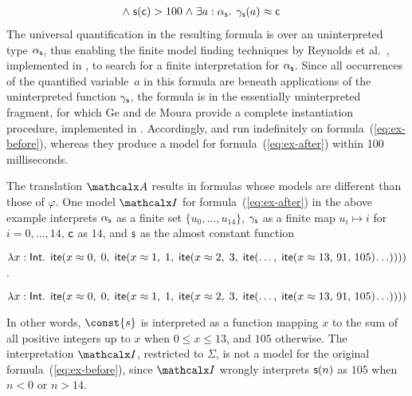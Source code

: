\begin{example}
\begin{equation}
\begin{aligned}[c]
\begin{aligned}[t]
\end{aligned}
\\[-\jot]
 & {\wedge}\; \con{s}( \con{c} ) > 100 \wedge \exists a : {\fargtype{\con{s}}}.\;\, \farg{\con{s}}( a ) \teq \con{c}
\end{aligned}
\end{equation}
%
The universal quantification in the resulting formula is over an uninterpreted
type $\alpha_{\mathsf{s}}$, thus enabling the finite model finding
techniques by Reynolds et al.\ \cite{ReyEtAl-1-RR-13,reynolds-et-al-2013},
implemented in \cvc, to search for a finite interpretation for $\alpha_{\mathsf{s}}$. 
Since all occurrences of the quantified variable~$a$ in this formula are 
beneath applications of the uninterpreted function $\gamma_{\mathsf{s}}$, 
the formula is in the essentially uninterpreted fragment,
for which Ge and de Moura \cite{GeDeM-CAV-09} provide 
a complete instantiation procedure, implemented in \ziii. 
Accordingly,
\cvc and \ziii run indefinitely on formula~(\ref{eq:ex-before}), 
whereas they produce a model for formula~(\ref{eq:ex-after}) 
within 100 milliseconds.\xend
\end{example}

\newcommand\badlambda{\lambda x : \typeint.\allowbreak\;\, \lite( x \teq 0,\allowbreak\; 0,\allowbreak\;
  \lite( x \teq 1,\allowbreak\; 1,\allowbreak\;
    \lite( x \teq 2,\allowbreak\; 3,\allowbreak\;
      \lite(\ldots,\allowbreak\; \lite( x \teq 13,\allowbreak\, 91,\allowbreak\, 105 )\negvthinspace \ldots ))))}

The translation $\conv$ results in formulas whose models are different than those of $\varphi$.
One model $\I$ for formula~(\ref{eq:ex-after}) in the above example interprets
$\alpha_{\mathsf{s}}$ as a finite set $\{ u_0, \ldots, u_{14} \}$,
$\gamma_{\mathsf{s}}$ as a finite map $u_i \mapsto i$ for $i = 0, \ldots, 14$,
$\mathsf{c}$ as $14$,
and $\mathsf{s}$ as the almost constant function
%
\begin{shortv}$\badlambda$. \end{shortv}%
\begin{longv}\[\badlambda\]\end{longv}%
%
In other words, $\const{s}$ is interpreted as a function mapping $x$ to the sum
of all positive integers up to $x$ when $0 \leq x \leq 13$, and $105$
otherwise.
The interpretation $\I$, restricted to $\Sigma$, is {not} a model for the original formula~(\ref{eq:ex-before}),
since $\I$ wrongly interprets $\mathsf{s}( n )$ as $105$ when $n < 0$ or $n > 14$.

